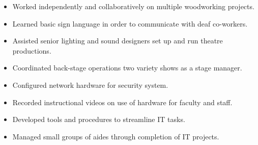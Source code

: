 \documentclass[10pt,a4paper,ragged2e,withhyper]{altacv}
\begin{document}
\divider

\begin{itemize}
\item Worked independently and collaboratively on multiple woodworking projects.
\item Learned basic sign language in order to communicate with deaf co-workers.
\item Assisted senior lighting and sound designers set up and run theatre productions.
\item Coordinated back-stage operations two variety shows as a stage manager.
\end{itemize}

\divider

\begin{itemize}
\item Configured network hardware for security system.
\item Recorded instructional videos on use of hardware for faculty and staff.
\item Developed tools and procedures to streamline IT tasks.
\item Managed small groups of aides through completion of IT projects.
\end{itemize}




















\end{document}

